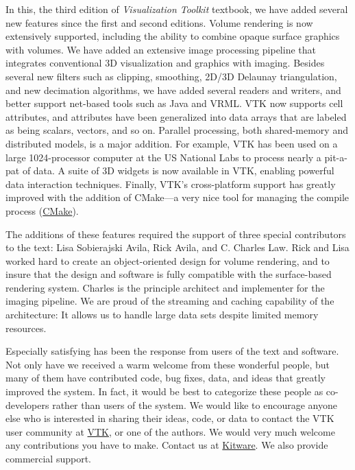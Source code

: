 In this, the third edition of \textit{Visualization Toolkit} textbook, we have added several new features since the first and second editions. Volume rendering is now extensively supported, including the ability to combine opaque surface graphics with volumes. We have added an extensive image processing pipeline that integrates conventional 3D visualization and graphics with imaging. Besides several new filters such as clipping, smoothing, 2D/3D Delaunay triangulation, and new decimation algorithms, we have added several readers and writers, and better support net-based tools such as Java and VRML. VTK now supports cell attributes, and attributes have been generalized into data arrays that are labeled as being scalars, vectors, and so on. Parallel processing, both shared-memory and distributed models, is a major addition. For example, VTK has been used on a large 1024-processor computer at the US National Labs to process nearly a pit-a-pat of data. A suite of 3D widgets is now available in VTK, enabling powerful data interaction techniques. Finally, VTK's cross-platform support has greatly improved with the addition of CMake---a very nice tool for managing the compile process (\href{https://www.cmake.org}{CMake}).

The additions of these features required the support of three special contributors to the text: Lisa Sobierajski Avila, Rick Avila, and C. Charles Law. Rick and Lisa worked hard to create an object-oriented design for volume rendering, and to insure that the design and software is fully compatible with the surface-based rendering system. Charles is the principle architect and implementer for the imaging pipeline. We are proud of the streaming and caching capability of the architecture: It allows us to handle large data sets despite limited memory resources.

Especially satisfying has been the response from users of the text and software. Not only have we received a warm welcome from these wonderful people, but many of them have contributed code, bug fixes, data, and ideas that greatly improved the system. In fact, it would be best to categorize these people as co-developers rather than users of the system. We would like to encourage anyone else who is interested in sharing their ideas, code, or data to contact the VTK user community at \href{https://www.vtk.org/}{VTK}, or one of the authors. We would very much welcome any contributions you have to make. Contact us at \href{https://www.kitware.com/}{Kitware}. We also provide commercial support.

